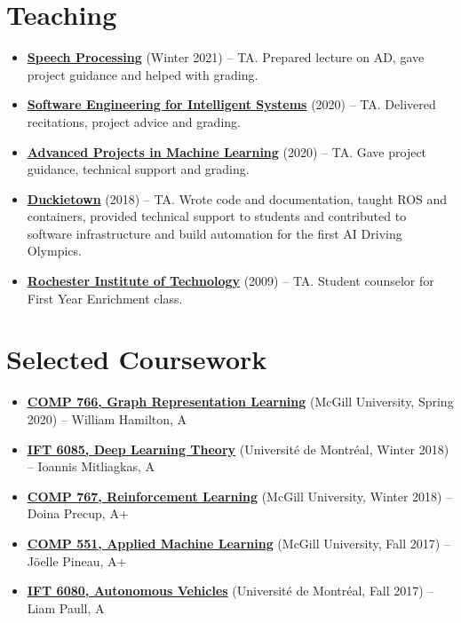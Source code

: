 \documentclass[letterpaper,11pt]{article}
\newcommand{\resumeItem}[2]{
  \item\small{\textbf{#1}{ #2 }}
}
\newcommand{\resumeSubItem}[2]{\resumeItem{#1}{#2}}
\newcommand{\resumeSubHeadingListStart}{\begin{itemize}[leftmargin=*]}
\newcommand{\resumeSubHeadingListEnd}{\end{itemize}}
\begin{document}
\begin{justify}
\section{Teaching}
\resumeSubHeadingListStart
\resumeSubItem{\href{https://speechbrain.github.io}{Speech Processing}}{(Winter 2021) -- TA. Prepared lecture on AD, gave project guidance and helped with grading.}
\resumeSubItem{\href{https://github.com/jin-guo/COMP598_Fall2020}{Software Engineering for Intelligent Systems}}{(2020) -- TA. Delivered recitations, project advice and grading.}
\resumeSubItem{\href{https://admission.umontreal.ca/cours-et-horaires/cours/IFT-6759/}{Advanced Projects in Machine Learning}}{(2020) -- TA. Gave project guidance, technical support and grading.}
\resumeSubItem{\href{https://duckietown.org/}{Duckietown}}{(2018) -- TA. Wrote code and documentation, taught ROS and containers, provided technical support to students and contributed to software infrastructure and build automation for the first AI Driving Olympics.}
\resumeSubItem{\href{https://www.rit.edu}{Rochester Institute of Technology}}{(2009) -- TA. Student counselor for First Year Enrichment class.}
\resumeSubHeadingListEnd

\section{Selected Coursework}
\resumeSubHeadingListStart
\resumeSubItem{\href{https://cs.mcgill.ca/~wlh/comp766/}{COMP 766, Graph Representation Learning}}{(McGill University, Spring 2020) -- William Hamilton, A}
\resumeSubItem{\href{https://mitliagkas.github.io/ift6085-dl-theory-class/}{IFT 6085, Deep Learning Theory}}{(Universit\'e de Montr\'eal, Winter 2018) -- Ioannis Mitliagkas, A}
\resumeSubItem{\href{https://www.cs.mcgill.ca/~dprecup/courses/rl.html}{COMP 767, Reinforcement Learning}}{(McGill University, Winter 2018) -- Doina Precup, A+}
\resumeSubItem{\href{https://www.cs.mcgill.ca/~jpineau/comp551/index.html}{COMP 551, Applied Machine Learning}}{(McGill University, Fall 2017) -- J\"oelle Pineau, A+}
\resumeSubItem{\href{http://liampaull.ca/courses/duckietown/index.html}{IFT 6080, Autonomous Vehicles}}{(Universit\'e de Montr\'eal, Fall 2017) -- Liam Paull, A}
\resumeSubHeadingListEnd


\end{justify}
\end{document}
